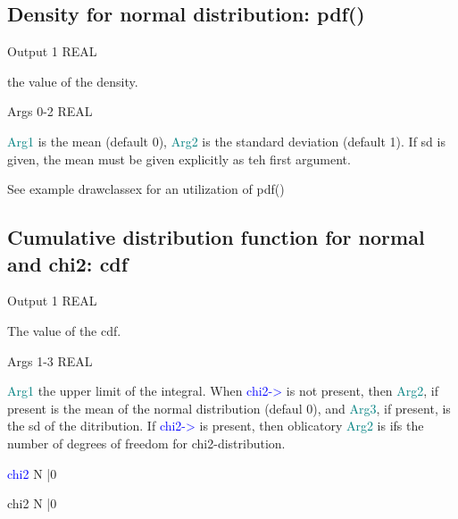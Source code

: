 \subsection{Density for normal distribution: \textcolor{VioletRed}{pdf}()}
\label{pdf}
\vspace{0.3cm}
\hline
\vspace{0.3cm}
\noindent Output  \tabto{3cm}  1  \tabto{5cm}   REAL  \tabto{7cm}
\begin{changemargin}{3cm}{0cm}
\noindent  the value of the density.
\end{changemargin}
\vspace{0.3cm}
\hline
\vspace{0.3cm}
\noindent Args  \tabto{3cm} 0-2  \tabto{5cm}   REAL  \tabto{7cm}
\begin{changemargin}{3cm}{0cm}
\noindent  \textcolor{teal}{Arg1} is the mean (default 0), \textcolor{teal}{Arg2} is the standard deviation
(default 1). If sd is given, the mean must be given explicitly as teh first argument.
\end {changemargin}
\hline
\vspace{0.2cm}
\begin{note}
See example drawclassex for an utilization of \textcolor{VioletRed}{pdf}()
\end{note}
\subsection{Cumulative distribution function for normal and chi2: \textcolor{VioletRed}{cdf}}
\label{cdf}
\vspace{0.3cm}
\hline
\vspace{0.3cm}
\noindent Output \tabto{3cm}  1  \tabto{5cm}   REAL  \tabto{7cm}
\begin{changemargin}{3cm}{0cm}
\noindent  The value of the cdf.
\end{changemargin}
\vspace{0.3cm}
\hline
\vspace{0.3cm}
\noindent Args  \tabto{3cm}  1-3  \tabto{5cm}   REAL \tabto{7cm}
\begin{changemargin}{3cm}{0cm}
\noindent  \textcolor{teal}{Arg1} the upper limit of the integral. When \textcolor{blue}{chi2->} is not present, then
\textcolor{teal}{Arg2}, if present is the mean of the normal distribution (defaul 0), and \textcolor{teal}{Arg3}, if present,
is the sd of the ditribution. If \textcolor{blue}{chi2->} is present, then oblicatory \textcolor{teal}{Arg2} is
ifs the number of degrees of freedom for chi2-distribution.
\end{changemargin}
\vspace{0.3cm}
\hline
\vspace{0.3cm}
\noindent \textcolor{blue}{chi2}  \tabto{3cm}  N |0  \tabto{5cm}    \tabto{7cm}
\begin{changemargin}{3cm}{0cm}
\noindent \noindent chi2  \tabto{3cm}  N |0  \tabto{5cm}    \tabto{7cm}
\end {changemargin}
\hline
\vspace{0.2cm}
